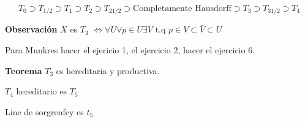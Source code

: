 
\[ T_0 \supset T_{1/2} \supset T_1 \supset T_2 \supset T_{2 1/2} \supset \textrm{Completamente Hausdorff} \supset T_3  \supset T_{3 1/2} \supset T_4   \]

\textbf{Observación} $ X  $ es $ T_3 $ $ \iff \forall U \forall p \in U \exists V  $ t.q  $ p \in V \subset \bar{V} \subset U $

Para Munkres hacer el ejericio 1, el ejercicio 2, hacer el ejercicio 6.

\textbf{Teorema} $ T_3 $ es hereditaria y productiva.


$ T_4 $ hereditario es $ T_5 $ 

Line de sorgrenfey es $ t_5 $